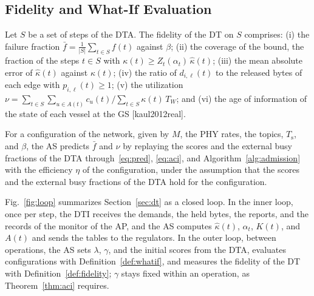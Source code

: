 \subsection{Fidelity and What-If Evaluation}\label{subsec:fidelity}

\begin{definition}\label{def:fidelity}
Let $S$ be a set of steps of the DTA. The fidelity of the DT on $S$ comprises: (i) the failure fraction $\bar{f} = \frac{1}{|S|}\sum_{t\in S} f(t)$ against $\beta$; (ii) the coverage of the bound, the fraction of the steps $t \in S$ with $\kappa(t) \geq Z_t(\alpha_t)\,\hat{\kappa}(t)$; (iii) the mean absolute error of $\hat{\kappa}(t)$ against $\kappa(t)$; (iv) the ratio of $d_{i,\ell}(t)$ to the released bytes of each edge with $p_{i,\ell}(t) \geq 1$; (v) the utilization $\nu = \sum_{t \in S}\sum_{u \in A(t)} c_u(t) \big/ \sum_{t\in S} \kappa(t)\,T_W$; and (vi) the age of information of the state of each vessel at the GS [kaul2012real].
\end{definition}

\begin{definition}\label{def:whatif}
For a configuration of the network, given by $M$, the PHY rates, the topics, $T_{\mathrm{s}}$, and $\beta$, the AS predicts $\bar{f}$ and $\nu$ by replaying the scores and the external busy fractions of the DTA through~\eqref{eq:pred}, \eqref{eq:aci}, and Algorithm~\ref{alg:admission} with the efficiency $\eta$ of the configuration, under the assumption that the scores and the external busy fractions of the DTA hold for the configuration.
\end{definition}

Fig.~\ref{fig:loop} summarizes Section~\ref{sec:dt} as a closed loop. In the inner loop, once per step, the DTI receives the demands, the held bytes, the reports, and the records of the monitor of the AP, and the AS computes $\hat{\kappa}(t)$, $\alpha_t$, $K(t)$, and $A(t)$ and sends the tables to the regulators. In the outer loop, between operations, the AS sets $\lambda$, $\gamma$, and the initial scores from the DTA, evaluates configurations with Definition~\ref{def:whatif}, and measures the fidelity of the DT with Definition~\ref{def:fidelity}; $\gamma$ stays fixed within an operation, as Theorem~\ref{thm:aci} requires.
